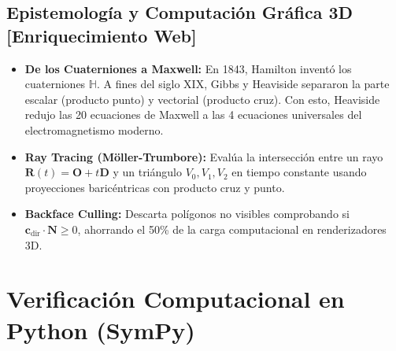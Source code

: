 \documentclass[10pt,letterpaper]{article}
\newcommand{\vn}{\mathbf{N}}
\begin{document}
\subsection{Epistemología y Computación Gráfica 3D [Enriquecimiento Web]}
\begin{itemize}
    \item \textbf{De los Cuaterniones a Maxwell:} En 1843, Hamilton inventó los cuaterniones $\mathbb{H}$. A fines del siglo XIX, Gibbs y Heaviside separaron la parte escalar (producto punto) y vectorial (producto cruz). Con esto, Heaviside redujo las 20 ecuaciones de Maxwell a las 4 ecuaciones universales del electromagnetismo moderno.
    \item \textbf{Ray Tracing (Möller-Trumbore):} Evalúa la intersección entre un rayo $\mathbf{R}(t) = \mathbf{O} + t\mathbf{D}$ y un triángulo $V_0, V_1, V_2$ en tiempo constante usando proyecciones baricéntricas con producto cruz y punto.
    \item \textbf{Backface Culling:} Descarta polígonos no visibles comprobando si $\mathbf{c}_{\text{dir}} \cdot \vn \ge 0$, ahorrando el 50\% de la carga computacional en renderizadores 3D.
\end{itemize}

\section{Verificación Computacional en Python (SymPy)}
\end{document}
